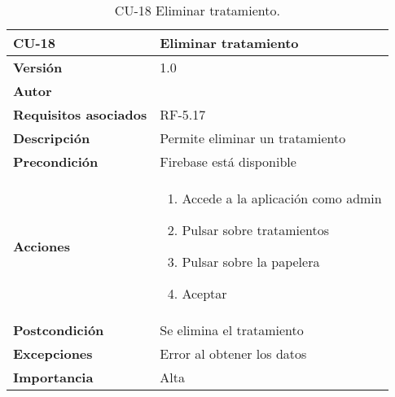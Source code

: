 \begin{table}[p]
	\centering
	\begin{tabularx}{\linewidth}{ p{} p{} }
		\toprule
		\textbf{CU-18}    & \textbf{Eliminar tratamiento}\\
		\toprule
		\textbf{Versión}              & 1.0    \\
		\textbf{Autor}                & {\nombre} \\
		\textbf{Requisitos asociados} & RF-5.17 \\
		\textbf{Descripción}          & Permite eliminar un tratamiento \\
		\textbf{Precondición}         & Firebase está disponible \\
		\textbf{Acciones}             &
		\begin{enumerate}
			\def\labelenumi{\arabic{enumi}.}
			\tightlist
			\item Accede a la aplicación como admin
			\item Pulsar sobre tratamientos
			\item Pulsar sobre la papelera
			\item Aceptar
		\end{enumerate}\\
		\textbf{Postcondición}        & Se elimina el tratamiento\\
		\textbf{Excepciones}          & Error al obtener los datos \\
		\textbf{Importancia}          & Alta \\
		\bottomrule
	\end{tabularx}
	\caption{CU-18 Eliminar tratamiento.}
\end{table}